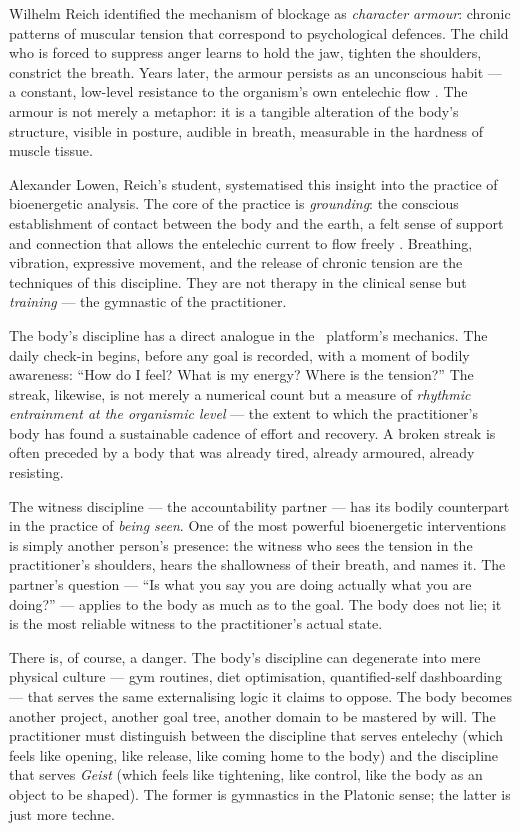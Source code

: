 Wilhelm Reich identified the mechanism of blockage as \emph{character armour}:
chronic patterns of muscular tension that correspond to psychological defences.
The child who is forced to suppress anger learns to hold the jaw, tighten the
shoulders, constrict the breath. Years later, the armour persists as an
unconscious habit --- a constant, low-level resistance to the organism's own
entelechic flow \parencite{reich1933character}. The armour is not merely a
metaphor: it is a tangible alteration of the body's structure, visible in
posture, audible in breath, measurable in the hardness of muscle tissue.

Alexander Lowen, Reich's student, systematised this insight into the practice
of bioenergetic analysis. The core of the practice is \emph{grounding}: the
conscious establishment of contact between the body and the earth, a felt sense
of support and connection that allows the entelechic current to flow freely
\parencite{lowen1975bioenergetics}. Breathing, vibration, expressive movement,
and the release of chronic tension are the techniques of this discipline. They
are not therapy in the clinical sense but \emph{training} --- the gymnastic of
the practitioner.

The body's discipline has a direct analogue in the \praxis\ platform's
mechanics. The daily check-in begins, before any goal is recorded, with a
moment of bodily awareness: ``How do I feel? What is my energy? Where is the
tension?'' The streak, likewise, is not merely a numerical count but a measure
of \emph{rhythmic entrainment at the organismic level} --- the extent to which
the practitioner's body has found a sustainable cadence of effort and recovery.
A broken streak is often preceded by a body that was already tired, already
armoured, already resisting.

The witness discipline --- the accountability partner --- has its bodily
counterpart in the practice of \emph{being seen}. One of the most powerful
bioenergetic interventions is simply another person's presence: the witness who
sees the tension in the practitioner's shoulders, hears the shallowness of
their breath, and names it. The partner's question --- ``Is what you say you are
doing actually what you are doing?'' --- applies to the body as much as to the
goal. The body does not lie; it is the most reliable witness to the
practitioner's actual state.

There is, of course, a danger. The body's discipline can degenerate into
mere physical culture --- gym routines, diet optimisation, quantified-self
dashboarding --- that serves the same externalising logic it claims to oppose.
The body becomes another project, another goal tree, another domain to be
mastered by will. The practitioner must distinguish between the discipline that
serves entelechy (which feels like opening, like release, like coming home to
the body) and the discipline that serves \emph{Geist} (which feels like
tightening, like control, like the body as an object to be shaped). The former
is gymnastics in the Platonic sense; the latter is just more techne.


